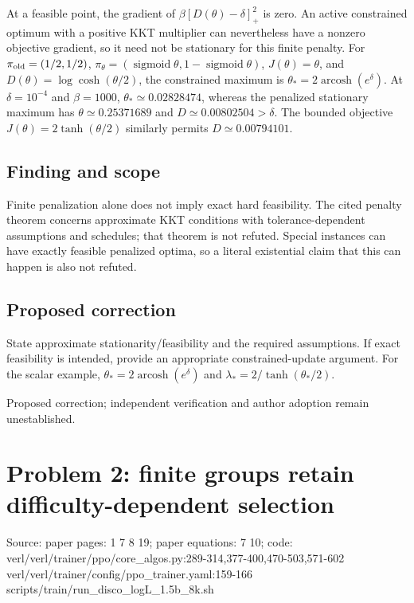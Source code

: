 \documentclass[11pt]{article}
\begin{document}
At a feasible point, the gradient of \(\beta[D(\theta)-\delta]_+^2\) is zero. An active constrained optimum with a positive KKT multiplier can nevertheless have a nonzero objective gradient, so it need not be stationary for this finite penalty. For \(\pi_{\rm old}=(1/2,1/2)\), \(\pi_\theta=(\operatorname{sigmoid}\theta,1-\operatorname{sigmoid}\theta)\), \(J(\theta)=\theta\), and \(D(\theta)=\log\cosh(\theta/2)\), the constrained maximum is \(\theta_*=2\operatorname{arcosh}(e^\delta)\). At \(\delta=10^{-4}\) and \(\beta=1000\), \(\theta_*\simeq0.02828474\), whereas the penalized stationary maximum has \(\theta\simeq0.25371689\) and \(D\simeq0.00802504>\delta\). The bounded objective \(J(\theta)=2\tanh(\theta/2)\) similarly permits \(D\simeq0.00794101\).

\subsection*{Finding and scope}

Finite penalization alone does not imply exact hard feasibility. The cited penalty theorem concerns approximate KKT conditions with tolerance-dependent assumptions and schedules; that theorem is not refuted. Special instances can have exactly feasible penalized optima, so a literal existential claim that this can happen is also not refuted.

\subsection*{Proposed correction}

State approximate stationarity/feasibility and the required assumptions. If exact feasibility is intended, provide an appropriate constrained-update argument. For the scalar example, \(\theta_*=2\operatorname{arcosh}(e^\delta)\) and \(\lambda_*=2/\tanh(\theta_*/2)\).

Proposed correction; independent verification and author adoption remain unestablished.

\section*{Problem 2: finite groups retain difficulty-dependent selection}

Source: paper pages: 1 7 8 19; paper equations: 7 10; code: verl/verl/trainer/ppo/core\_algos.py:289-314,377-400,470-503,571-602 verl/verl/trainer/config/ppo\_trainer.yaml:159-166 scripts/train/run\_disco\_logL\_1.5b\_8k.sh
\end{document}

